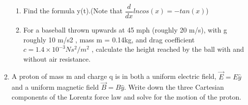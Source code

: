 \documentclass[fleqn]{article}
\begin{document}
\begin{enumerate}
\begin{enumerate}
      \item Find the formula y(t).(Note that $\dfrac{d}{dx}ln cos(x)=-tan(x)$)

      \item For a baseball thrown upwards at 45 mph (roughly 20 m/s), with g roughly 10 m/s2
      , mass m = 0.14kg, and drag coefficient $c=1.4 × 10^{-3}Ns^2/m^2$
      , calculate the height reached by the ball with and without air resistance.
      
    \end{enumerate}

    \item  A proton of mass m and charge q is in both a uniform electric field,
    $\overrightarrow{E}=E\hat{y}$ and a uniform magnetic field $\overrightarrow{B}=B\hat{y}$. Write down the three
    Cartesian components of the Lorentz force law and solve for the motion of the proton.

  \end{enumerate}
\end{document}
